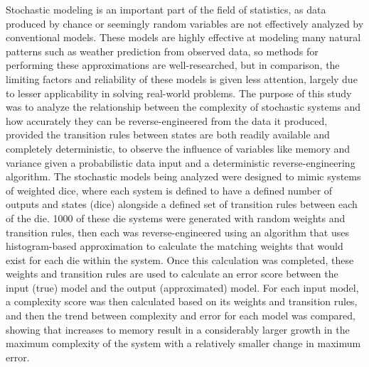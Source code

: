\documentclass[12pt]{article}
\begin{document}
Stochastic modeling is an important part of the field of statistics, as data produced by chance or seemingly random variables are not effectively analyzed by conventional models. These models are highly effective at modeling many natural patterns such as weather prediction from observed data, so methods for performing these approximations are well-researched, but in comparison, the limiting factors and reliability of these models is given less attention, largely due to lesser applicability in solving real-world problems. The purpose of this study was to analyze the relationship between the complexity of stochastic systems and how accurately they can be reverse-engineered from the data it produced, provided the transition rules between states are both readily available and completely deterministic, to observe the influence of variables like memory and variance given a probabilistic data input and a deterministic reverse-engineering algorithm. The stochastic models being analyzed were designed to mimic systems of weighted dice, where each system is defined to have a defined number of outputs and states (dice) alongside a defined set of transition rules between each of the die. 1000 of these die systems were generated with random weights and transition rules, then each was reverse-engineered using an algorithm that uses histogram-based approximation to calculate the matching weights that would exist for each die within the system. Once this calculation was completed, these weights and transition rules are used to calculate an error score between the input (true) model and the output (approximated) model. For each input model, a complexity score was then calculated based on its weights and transition rules, and then the trend between complexity and error for each model was compared, showing that increases to memory result in a considerably larger growth in the maximum complexity of the system with a relatively smaller change in maximum error.
\end{document}
